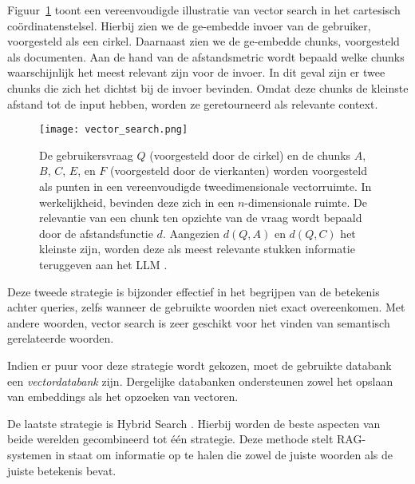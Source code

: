 Figuur~\ref{fig:vector_search} toont een vereenvoudigde illustratie van vector search in het cartesisch coördinatenstelsel. Hierbij zien we de ge-embedde invoer van de gebruiker, voorgesteld als een cirkel. Daarnaast zien we de ge-embedde chunks, voorgesteld als documenten. Aan de hand van de afstandsmetric wordt bepaald welke chunks waarschijnlijk het meest relevant zijn voor de invoer. In dit geval zijn er twee chunks die zich het dichtst bij de invoer bevinden. Omdat deze chunks de kleinste afstand tot de input hebben, worden ze geretourneerd als relevante context.

\begin{figure}
    \centering
    \texttt{[image: vector\_search.png]}
    \caption[Vulgarisatie van Vector Search in het cartesisch coördinatenstelsel]{\label{fig:vector_search}De gebruikersvraag $Q$ (voorgesteld door de cirkel) en de chunks $A$, $B$, $C$, $E$, en $F$ (voorgesteld door de vierkanten) worden voorgesteld als punten in een vereenvoudigde tweedimensionale vectorruimte. In werkelijkheid, bevinden deze zich in een $n$-dimensionale ruimte. De relevantie van een chunk ten opzichte van de vraag wordt bepaald door de afstandsfunctie $d$. Aangezien $d(Q, A)$ en $d(Q, C)$ het kleinste zijn, worden deze als meest relevante stukken informatie teruggeven aan het LLM \autocite{Vespa2023}.}
\end{figure}
        
Deze tweede strategie is bijzonder effectief in het begrijpen van de betekenis achter queries, zelfs wanneer de gebruikte woorden niet exact overeenkomen. Met andere woorden, vector search is zeer geschikt voor het vinden van semantisch gerelateerde woorden.

Indien er puur voor deze strategie wordt gekozen, moet de gebruikte databank een \emph{vectordatabank} zijn. Dergelijke databanken ondersteunen zowel het opslaan van embeddings als het opzoeken van vectoren.

De laatste strategie is Hybrid Search \autocite{Bansal2023}. Hierbij worden de beste aspecten van beide werelden gecombineerd tot één strategie. Deze methode stelt RAG-systemen in staat om informatie op te halen die zowel de juiste woorden als de juiste betekenis bevat. 

\subsection{}%
\label{subsec:valkuilen}

